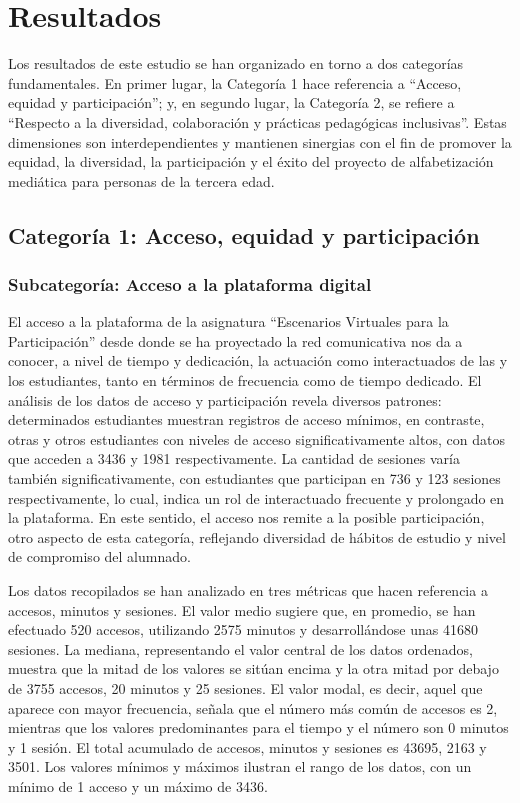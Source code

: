 

\section{Resultados}\label{sec-resultados}
Los resultados de este estudio se han organizado en torno a dos
categorías fundamentales. En primer lugar, la Categoría 1 hace
referencia a ``Acceso, equidad y participación''; y, en segundo lugar,
la Categoría 2, se refiere a ``Respecto a la diversidad, colaboración y
prácticas pedagógicas inclusivas''. Estas dimensiones son
interdependientes y mantienen sinergias con el fin de promover la
equidad, la diversidad, la participación y el éxito del proyecto de
alfabetización mediática para personas de la tercera edad.
	

\subsection{Categoría 1: Acceso, equidad y participación}\label{sub-sec-categoría}
	

\subsubsection{Subcategoría: Acceso a la plataforma digital}\label{sub-sub-sec-subcategoríaacessoala}
	
El acceso a la plataforma de la asignatura ``Escenarios Virtuales para
la Participación'' desde donde se ha proyectado la red comunicativa nos
da a conocer, a nivel de tiempo y dedicación, la actuación como
interactuados de las y los estudiantes, tanto en términos de frecuencia
como de tiempo dedicado. El análisis de los datos de acceso y
participación revela diversos patrones: determinados estudiantes
muestran registros de acceso mínimos, en contraste, otras y otros
estudiantes con niveles de acceso significativamente altos, con datos
que acceden a 3436 y 1981 respectivamente. La cantidad de sesiones varía
también significativamente, con estudiantes que participan en 736 y 123
sesiones respectivamente, lo cual, indica un rol de interactuado
frecuente y prolongado en la plataforma. En este sentido, el acceso nos
remite a la posible participación, otro aspecto de esta categoría,
reflejando diversidad de hábitos de estudio y nivel de compromiso del
alumnado.
	
Los datos recopilados se han analizado en tres métricas que hacen
referencia a accesos, minutos y sesiones. El valor medio sugiere que, en
promedio, se han efectuado 520 accesos, utilizando 2575 minutos y
desarrollándose unas 41680 sesiones. La mediana, representando el valor
central de los datos ordenados, muestra que la mitad de los valores se
sitúan encima y la otra mitad por debajo de 3755 accesos, 20 minutos y
25 sesiones. El valor modal, es decir, aquel que aparece con mayor
frecuencia, señala que el número más común de accesos es 2, mientras que
los valores predominantes para el tiempo y el número son 0 minutos y 1
sesión. El total acumulado de accesos, minutos y sesiones es 43695, 2163
y 3501. Los valores mínimos y máximos ilustran el rango de los datos,
con un mínimo de 1 acceso y un máximo de 3436.
	
